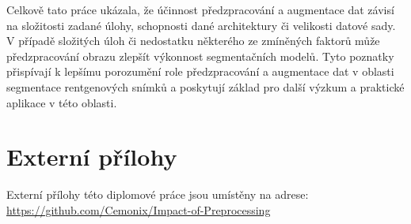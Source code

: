 \documentclass[male,czech,api_ing]{thesis}
\begin{document}
Celkově tato práce ukázala, že účinnost předzpracování a augmentace dat závisí na složitosti zadané úlohy, schopnosti dané architektury či velikosti datové sady. V případě složitých úloh či nedostatku některého ze zmíněných faktorů může předzpracování obrazu zlepšít výkonnost segmentačních modelů. Tyto poznatky přispívají k lepšímu porozumění role předzpracování a augmentace dat v oblasti segmentace rentgenových snímků a poskytují základ pro další výzkum a praktické aplikace v této oblasti.

\printbibliography[title=Seznam použitých zdrojů]

\listoffigures

\listoftables

\lstlistoflistings

\appendix

\chapter{Externí přílohy\label{sec:ep}}




Externí přílohy této diplomové práce jsou umístěny na adrese: \\
\url{https://github.com/Cemonix/Impact-of-Preprocessing}
\end{document}
